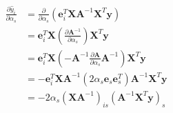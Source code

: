 \documentclass[10pt]{article}
\begin{document}
\begin{align*}\begin{split}
\frac{\partial \hat{y}_i}{\partial \alpha_s} &= \frac{\partial}{\partial \alpha_s} 
\left( \boldsymbol e_i^T \boldsymbol X \boldsymbol A^{-1} \boldsymbol X^T \boldsymbol y \right) \\
&= \boldsymbol e_i^T \boldsymbol X \left( \frac{\partial \boldsymbol A^{-1}}{\partial \alpha_s} \right) \boldsymbol X^T \boldsymbol y \\
&= \boldsymbol e_i^T \boldsymbol X \left(-\boldsymbol A^{-1} \frac{\partial \boldsymbol A}{\partial \alpha_s} \boldsymbol A^{-1} \right)
\boldsymbol X^T \boldsymbol y \\
&= - \boldsymbol e_i^T \boldsymbol X \boldsymbol A^{-1} 
\left( 2 \alpha_s \boldsymbol e_s \boldsymbol e_s^T \right)
\boldsymbol A^{-1} \boldsymbol X^T \boldsymbol y \\
&= -2 \alpha_s \left( \boldsymbol X \boldsymbol A^{-1} \right)_{is}
\left( \boldsymbol A^{-1} \boldsymbol X^T \boldsymbol y \right)_s \\
\end{split}\end{align*}
\end{document}
